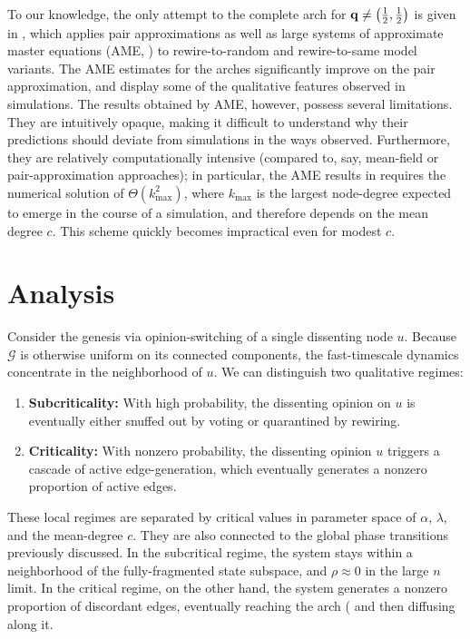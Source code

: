 \documentclass[review, onefignum, onetabnum]{siamart171218}
\begin{document}
		To our knowledge, the only attempt to the complete arch for $\mathbf{q} \neq \left(\frac{1}{2}, \frac{1}{2}\right)$ is given in \cite{Durrett2012}, which applies pair approximations as well as large systems of approximate master equations (AME, \cite{Gleeson2013}) to rewire-to-random and rewire-to-same model variants. 
		The AME estimates for the arches significantly improve on the pair approximation, and display some of the qualitative features observed in simulations. 
		The results obtained by AME, however, possess several limitations. 
		They are intuitively opaque, making it difficult to understand why their predictions should deviate from simulations in the ways observed.  
		Furthermore, they are relatively computationally intensive (compared to, say, mean-field or pair-approximation approaches); in particular, the AME results in \cite{Durrett2012} requires the numerical solution of $\Theta(k_\mathrm{max}^2)$, where $k_\mathrm{max}$ is the largest node-degree expected to emerge in the course of a simulation, and therefore depends on the mean degree $c$. 
		This scheme quickly becomes impractical even for modest $c$. 

	
	
	\section{Analysis}
	
	Consider the genesis via opinion-switching of a single dissenting node $u$. 
	Because $\mathcal{G}$ is otherwise uniform on its connected components, the fast-timescale dynamics concentrate in the neighborhood of $u$. 
	We can distinguish two qualitative regimes: 
	\begin{enumerate}
		\item \textbf{Subcriticality:} With high probability, the dissenting opinion on $u$ is eventually either snuffed out by voting or quarantined by rewiring. 
		\item \textbf{Criticality:} With nonzero probability, the dissenting opinion $u$ triggers a cascade of active edge-generation, which eventually generates a nonzero proportion of active edges. 
	\end{enumerate}
	These local regimes are separated by critical values in parameter space of $\alpha$, $\lambda$, and the mean-degree $c$. 
	They are also connected to the global phase transitions previously discussed. 
	In the subcritical regime, the system stays within a neighborhood of the fully-fragmented state subspace, and $\rho \approx 0$ in the large $n$ limit. 
	In the critical regime, on the other hand, the system generates a nonzero proportion of discordant edges, eventually reaching the arch ( and then diffusing along it. 
	
\end{document}
